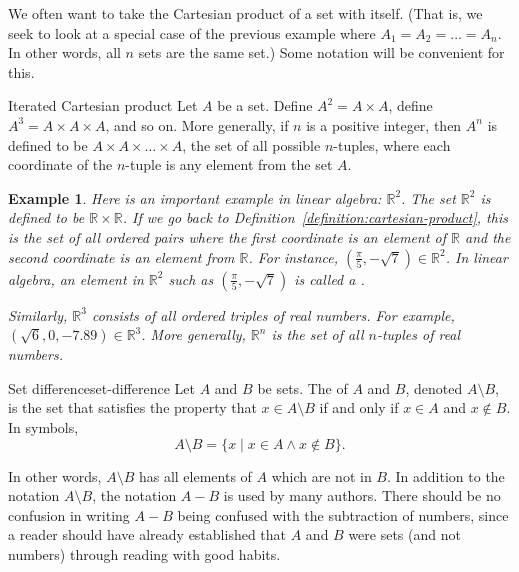 \documentclass{book}
\newcounter{ekcounter}%
\theoremstyle{ekimcustom}
\newtheorem{example}[ekcounter]{Example}
\newcommand\defn[1]{{\color{blue}{\bf #1}}}
\begin{document}
We often want to take the Cartesian product of a set with itself. (That is, we seek to look at a special case of the previous example where $A_1 = A_2 = \dots = A_n$. In other words, all $n$ sets are the same set.) Some notation will be convenient for this.
\begin{bdefinition}{Iterated Cartesian product}{}
Let $A$ be a set. Define $A^2 = A \times A$, define $A^3 = A \times A \times A$, and so on. More generally, if $n$ is a positive integer, then $A^n$ is defined to be $A \times A \times \dots \times A$, the set of all possible $n$-tuples, where each coordinate of the $n$-tuple is any element from the set $A$.
\end{bdefinition}
\begin{example}\label{example:vector-in-Cartesian-product}
Here is an important example in linear algebra: $\mathbb{R}^2$. The set $\mathbb{R}^2$ is defined to be $\mathbb{R} \times \mathbb{R}$. If we go back to Definition~\ref{definition:cartesian-product}, this is the set of all ordered pairs where the first coordinate is an element of $\mathbb{R}$ and the second coordinate is an element from $\mathbb{R}$. For instance, $(\frac{\pi}{5},-\sqrt{7}) \in \mathbb{R}^2$. In linear algebra, an element in $\mathbb{R}^2$ such as $(\frac{\pi}{5},-\sqrt{7})$ is called a \defn{vector}.

Similarly, $\mathbb{R}^3$ consists of all ordered triples of real numbers. For example, $(\sqrt{6},0,-7.89) \in \mathbb{R}^3$. More generally, $\mathbb{R}^n$ is the set of all $n$-tuples of real numbers.
\end{example}

\begin{bdefinition}{Set difference}{set-difference}
Let $A$ and $B$ be sets. The \defn{set difference} of $A$ and $B$, denoted $A \setminus B$, is the set that satisfies the property that $x \in A \setminus B$ if and only if $x \in A$ and $x \not\in B$. In symbols,
\[ A \setminus B = \{ x \mid x \in A \wedge x \not\in B\}.\]
\end{bdefinition}
In other words, $A \setminus B$ has all elements of $A$ which are not in $B$. In addition to the notation $A \setminus B$, the notation $A-B$ is used by many authors. There should be no confusion in writing $A-B$ being confused with the subtraction of numbers, since a reader should have already established that $A$ and $B$ were sets (and not numbers) through reading with good habits.
\end{document}

